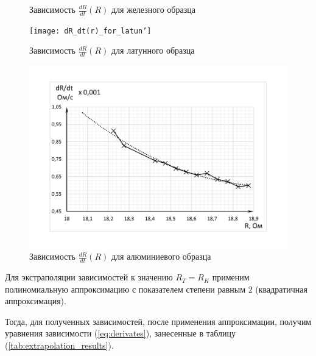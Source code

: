 \documentclass[12pt,a4paper]{article}
\begin{document}
\begin{figure}[h!]
\begin{center}
\begin{minipage}[h]{0.48\linewidth}
				\caption{Зависимость $\frac{dR}{dt} \left( R \right)$ для железного образца}
				\label{ris:dR_dt(r)_for_steel}
			\end{minipage}
		\end{center}
		\begin{center}
			\begin{minipage}[h]{0.48\linewidth}
				\texttt{[image: dR\_dt(r)\_for\_latun']}
				\caption{Зависимость $\frac{dR}{dt} \left( R \right)$ для латунного образца} 
				\label{ris:dR_dt(r)_for_latun'} %
			\end{minipage}
		\hfill
			\begin{minipage}[h]{0.48\linewidth}
				\includegraphics[width=1\linewidth]{dR_dt(r)_for_aluminium}
				\caption{Зависимость $\frac{dR}{dt} \left( R \right)$ для алюминиевого образца}
				\label{ris:dR_dt(r)_for_aluminium}
			\end{minipage}
		\end{center}
	\end{figure}
	
	Для экстраполяции зависимостей к значению $R_{T} = R_{K}$ применим полиномиальную аппроксимацию с показателем степени равным 2 (квадратичная аппроксимация).
	
	Тогда, для полученных зависимостей, после применения аппроксимации, получим  уравнения зависимости  (\ref{eq:derivates}), занесенные в таблицу (\ref{tab:extrapolation_results}).
	
\end{document}
